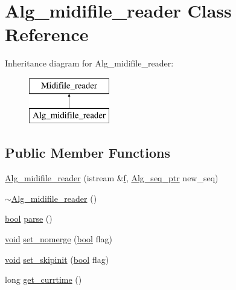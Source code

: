 \hypertarget{class_alg__midifile__reader}{}\section{Alg\+\_\+midifile\+\_\+reader Class Reference}
\label{class_alg__midifile__reader}
Inheritance diagram for Alg\+\_\+midifile\+\_\+reader\+:\begin{figure}[H]
\begin{center}
\leavevmode
\includegraphics[height=2.000000cm]{class_alg__midifile__reader}
\end{center}
\end{figure}
\subsection*{Public Member Functions}
\begin{DoxyCompactItemize}
\item 
\hyperlink{class_alg__midifile__reader_a3a6589a2c010bd4adc0c2f321605495e}{Alg\+\_\+midifile\+\_\+reader} (istream \&\hyperlink{checksum_8c_ae747d72a1a803f5ff4a4b2602857d93b}{f}, \hyperlink{allegro_8h_aad5a663237745add3ab7fec40d5f2c87}{Alg\+\_\+seq\+\_\+ptr} new\+\_\+seq)
\item 
\hyperlink{class_alg__midifile__reader_a4a9d9435a51e74818a57d69583182a48}{$\sim$\+Alg\+\_\+midifile\+\_\+reader} ()
\item 
\hyperlink{mac_2config_2i386_2lib-src_2libsoxr_2soxr-config_8h_abb452686968e48b67397da5f97445f5b}{bool} \hyperlink{class_alg__midifile__reader_a28887aea17fb1eba59ffa9737d5e88c4}{parse} ()
\item 
\hyperlink{sound_8c_ae35f5844602719cf66324f4de2a658b3}{void} \hyperlink{class_alg__midifile__reader_a3780c994a2af7f800f6fb7b18fbed4fd}{set\+\_\+nomerge} (\hyperlink{mac_2config_2i386_2lib-src_2libsoxr_2soxr-config_8h_abb452686968e48b67397da5f97445f5b}{bool} flag)
\item 
\hyperlink{sound_8c_ae35f5844602719cf66324f4de2a658b3}{void} \hyperlink{class_alg__midifile__reader_ac6dc3560f2d8a6b3718854b6ffcd825c}{set\+\_\+skipinit} (\hyperlink{mac_2config_2i386_2lib-src_2libsoxr_2soxr-config_8h_abb452686968e48b67397da5f97445f5b}{bool} flag)
\item 
long \hyperlink{class_alg__midifile__reader_a2b5e2f0c3f98fe736d18545af29d9fbd}{get\+\_\+currtime} ()
\end{DoxyCompactItemize}
